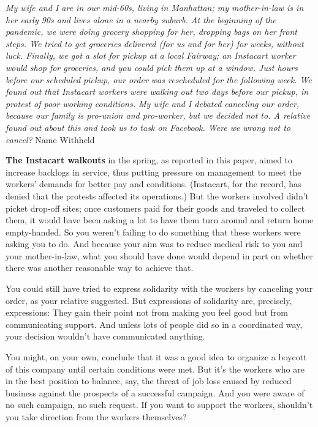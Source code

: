 \emph{My wife and I are in our mid-60s, living in Manhattan; my
mother-in-law is in her early 90s and lives alone in a nearby suburb. At
the beginning of the pandemic, we were doing grocery shopping for her,
dropping bags on her front steps. We tried to get groceries delivered
(for us and for her) for weeks, without luck. Finally, we got a slot for
pickup at a local Fairway; an Instacart worker would shop for groceries,
and you could pick them up at a window. Just hours before our scheduled
pickup, our order was rescheduled for the following week. We found out
that Instacart workers were walking out two days before our pickup, in
protest of poor working conditions. My wife and I debated canceling our
order, because our family is pro-union and pro-worker, but we decided
not to. A relative found out about this and took us to task on Facebook.
Were we wrong not to cancel?} Name Withheld

\textbf{The Instacart walkouts} in the spring, as reported in this
paper, aimed to increase backlogs in service, thus putting pressure on
management to meet the workers' demands for better pay and conditions.
(Instacart, for the record, has denied that the protests affected its
operations.) But the workers involved didn't picket drop-off sites; once
customers paid for their goods and traveled to collect them, it would
have been asking a lot to have them turn around and return home
empty-handed. So you weren't failing to do something that these workers
were asking you to do. And because your aim was to reduce medical risk
to you and your mother-in-law, what you should have done would depend in
part on whether there was another reasonable way to achieve that.

You could still have tried to express solidarity with the workers by
canceling your order, as your relative suggested. But expressions of
solidarity are, precisely, expressions: They gain their point not from
making you feel good but from communicating support. And unless lots of
people did so in a coordinated way, your decision wouldn't have
communicated anything.

You might, on your own, conclude that it was a good idea to organize a
boycott of this company until certain conditions were met. But it's the
workers who are in the best position to balance, say, the threat of job
loss caused by reduced business against the prospects of a successful
campaign. And you were aware of no such campaign, no such request. If
you want to support the workers, shouldn't you take direction from the
workers themselves?

